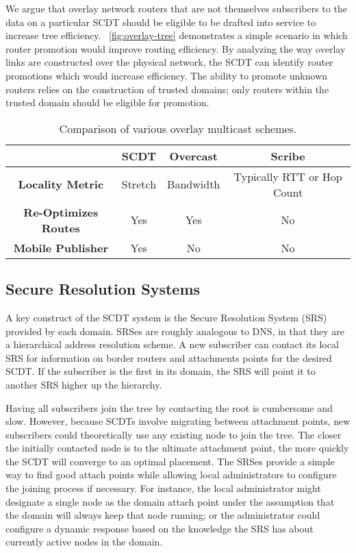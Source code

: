 We argue that overlay network routers that are not themselves subscribers to the
data on a particular SCDT should be eligible to be drafted into service to
increase tree efficiency. ~\autoref{fig:overlay-tree} demonstrates a simple 
scenario in which
router promotion would improve routing efficiency.  By analyzing the way overlay
links are constructed over the physical network, the SCDT can identify router
promotions which would increase efficiency.  The ability to promote unknown
routers relies on the construction of trusted domains; only routers within the
trusted domain should be eligible for promotion.
\begin{table}
	\begin{center}
		\begin{tabular}{|c|c|c|c|}
			\hline
			& \textbf{SCDT} & \textbf{Overcast} & \textbf{Scribe} \\
			\hline
			\textbf{Locality Metric} & Stretch & Bandwidth & Typically RTT or Hop Count \\
			\hline
			\textbf{Re-Optimizes Routes} & Yes & Yes & No \\
			\hline
			\textbf{Mobile Publisher} & Yes & No & No \\
			\hline
		\end{tabular}
	\end{center}
	\caption{Comparison of various overlay multicast schemes.}
\end{table}

\subsection{Secure Resolution Systems}
\label{sec-resolution-system}

A key construct of the SCDT system is the Secure Resolution System (SRS)
provided by each domain.  SRSes are roughly analogous to DNS, in that they are a
hierarchical address resolution scheme.  A new subscriber can contact its local
SRS for information on border routers and attachments points for the desired
SCDT.  If the subscriber is the first in its domain, the SRS will point it to
another SRS higher up the hierarchy.

Having all subscribers join the tree by contacting the root is cumbersome and slow. However, because SCDTs involve migrating between attachment points, new subscribers could theoretically use any existing node to join the tree. The closer the initially contacted node is to the ultimate attachment point, the more quickly the SCDT will converge to an optimal placement. The SRSes provide a simple way to find good attach points while allowing local administrators to configure the joining process if necessary. For instance, the local administrator might designate a single node as the domain attach point under the assumption that the domain will always keep that node running; or the administrator could configure a dynamic response based on the knowledge the SRS has about currently active nodes in the domain.

